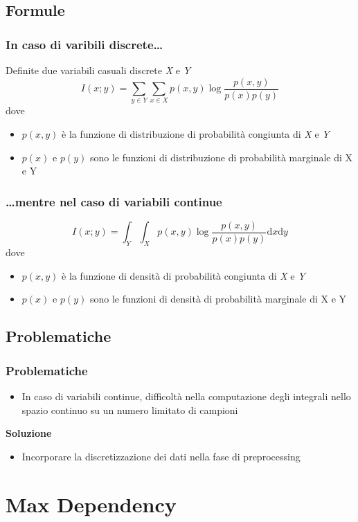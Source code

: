 \documentclass{beamer}
\begin{document}
\subsection{Formule}
\begin{frame}
	\frametitle{In caso di varibili discrete\dots}
	Definite due variabili casuali discrete \emph{X} e \emph{Y}
	$$ I (x;y) = \sum\limits_{y \in Y} \sum\limits_{x \in X} p(x,y)\log \frac{p(x,y)}{p(x)p(y)}$$
	dove
	\begin{itemize}
		\item $p(x,y)$ è la funzione di distribuzione di probabilità congiunta di \emph{X} e \emph{Y}
		\item $p(x)$ e $p(y)$ sono le funzioni di distribuzione di probabilità marginale di X e Y
	\end{itemize}
\end{frame}
\begin{frame}
	\frametitle{\dots mentre nel caso di variabili continue}
	$$ I (x;y) = \int_Y \int_X p(x,y)\log \frac{p(x,y)}{p(x)p(y)} \mathrm{d}x \mathrm{d}y$$
	dove
	\begin{itemize}
		\item $p(x,y)$ è la funzione di densità di probabilità congiunta di \emph{X} e \emph{Y}
		\item $p(x)$ e $p(y)$ sono le funzioni di densità di probabilità marginale di X e Y
	\end{itemize}
\end{frame}
\subsection{Problematiche}
\begin{frame}
	\frametitle{Problematiche}
	\begin{itemize}
		\item In caso di variabili continue, difficoltà nella computazione degli integrali nello spazio continuo su un numero limitato di campioni
	\end{itemize}
	\textbf{Soluzione}
	\begin{itemize}
		\item Incorporare la discretizzazione dei dati nella fase di preprocessing
	\end{itemize}
\end{frame}


\section{Max Dependency}
\end{document}
